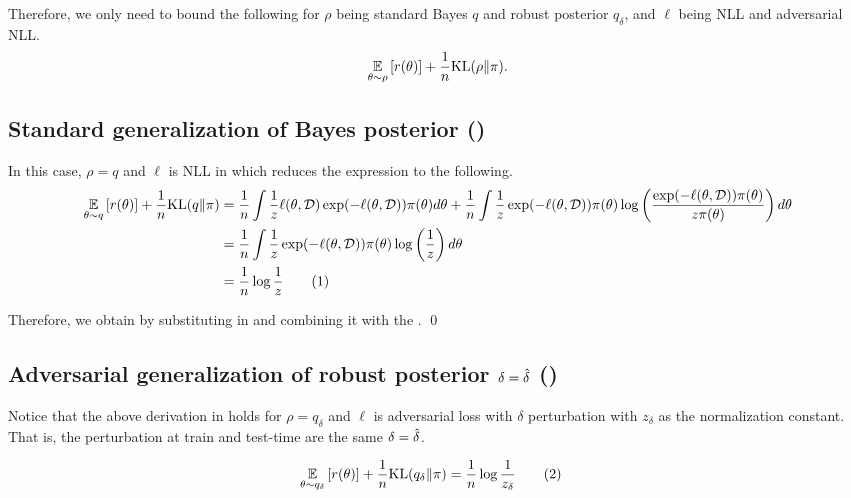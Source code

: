 Therefore, we only need to bound the following for $\rho$ being standard Bayes $q$ and robust posterior $q_\delta$, and $\ell$ being NLL and adversarial NLL.
\begin{align}
\underset{\theta \sim \rho}{\mathbb{E}}\left[r(\theta)\right] + \frac{1}{n} \mathrm{KL}({\rho} \| \pi). \label{eq:eff_pac_bound}
\end{align}

\subsection{Standard generalization of Bayes posterior (\MakeLowercase{)}}
\label{pf:std_post_std_loss}
In this case, $\rho = q$ and $\ell$ is NLL in  which reduces the expression to the following.
\begin{align*}
    \expectation{\theta \sim q}{r(\theta)} + \frac{1}{n} \mathrm{KL}({q} \| \pi) 
    &= \frac{1}{n} \int \frac{1}{{z}}\ell(\theta, \mathcal{D}) \exp(-\ell(\theta, \mathcal{D}))\pi(\theta) d\theta + \frac{1}{n} \int \frac{1}{{z}} \exp(-\ell(\theta, \mathcal{D}))\pi(\theta) \log \lp \frac{\exp(-\ell(\theta, \mathcal{D}))\pi(\theta)}{z\pi(\theta)} \rp d\theta \\
    &= \frac{1}{n} \int \frac{1}{z} \exp(-\ell(\theta, \mathcal{D}))\pi(\theta) \log \lp \frac{1}{z} \rp d\theta \\
    &= \frac{1}{n} \log \frac{1}{z} \stepcounter{equation}\tag{\theequation}\label{eq:std_post_std_loss_normz}
\end{align*}

Therefore, we obtain  by substituting  in  and combining it with the .
\qed

\subsection{Adversarial generalization of robust posterior $\delta=\hat{\delta}$ (\MakeLowercase{)}}

Notice that the above derivation in  holds for $\rho=q_\delta$ and $\ell$ is adversarial loss with $\delta$ perturbation with $z_\delta$ as the normalization constant. That is, the perturbation at train and test-time are the same $\delta=\hat{\delta}$. 

\begin{align*}
    \expectation{\theta \sim q_\delta}{r(\theta)} + \frac{1}{n} \mathrm{KL}({q_\delta} \| \pi) 
    &= \frac{1}{n} \log \frac{1}{z_\delta} \stepcounter{equation}\tag{\theequation}\label{eq:adv_post_adv_loss_normz}
\end{align*}

